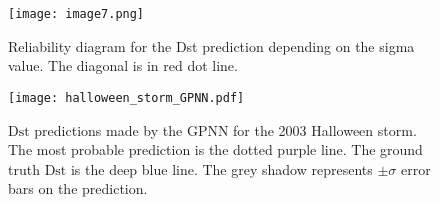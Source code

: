 



\begin{figure}
	\texttt{[image: image7.png]}
	\caption{Reliability diagram for the Dst prediction depending on the sigma value. The diagonal is in red dot line.}
	\label{fig:gpnnreliabilitysigma}	
\end{figure}




\begin{figure}
	\texttt{[image: halloween\_storm\_GPNN.pdf]}
	\caption{$\text{Dst}$ predictions made by the GPNN for the 2003 Halloween storm. 
	The most probable prediction is the dotted purple line. 
	The ground truth $\text{Dst}$ is the deep blue line. 
	The grey shadow represents $\pm\sigma$ error bars on the prediction.}
    \label{fig:gpnnhalloween}
\end{figure}




